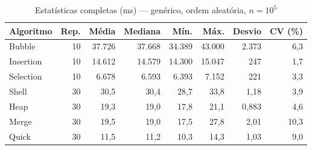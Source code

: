 \begin{table}[htbp]\centering\small
\caption{Estatísticas completas (ms) — genérico, ordem aleatória, $n = 10^5$}\label{tab:det-gen-100k}
\begin{tabular}{lrrrrrrr}
\toprule
Algoritmo & Rep. & Média & Mediana & Mín. & Máx. & Desvio & CV (\%) \\
\midrule
Bubble & 10 & 37.726 & 37.668 & 34.389 & 43.000 & 2.373 & 6,3 \\
Insertion & 10 & 14.612 & 14.579 & 14.300 & 15.047 & 247 & 1,7 \\
Selection & 10 & 6.678 & 6.593 & 6.393 & 7.152 & 221 & 3,3 \\
Shell & 30 & 30,5 & 30,4 & 28,7 & 33,8 & 1,18 & 3,9 \\
Heap & 30 & 19,3 & 19,0 & 17,8 & 21,1 & 0,883 & 4,6 \\
Merge & 30 & 19,5 & 19,0 & 17,5 & 27,8 & 2,01 & 10,3 \\
Quick & 30 & 11,5 & 11,2 & 10,3 & 14,3 & 1,03 & 9,0 \\
\bottomrule
\end{tabular}
\end{table}